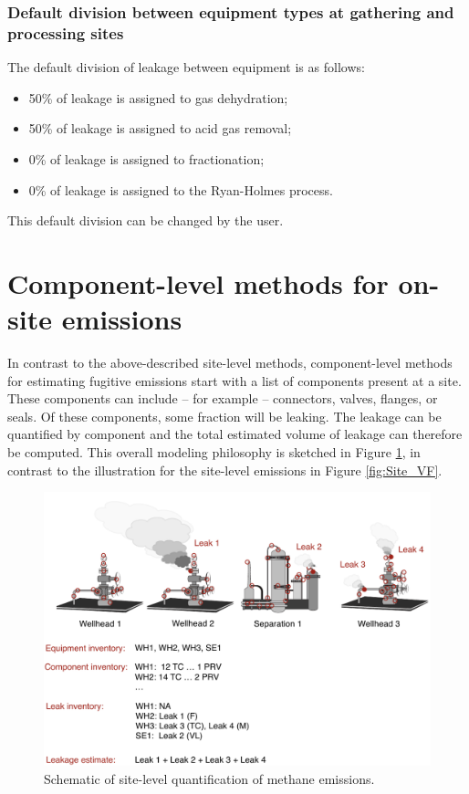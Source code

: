 \documentclass[11pt]{report}
\begin{document}
\subsubsection{Default division between equipment types at gathering and processing sites}

The default division of leakage between equipment is as follows:
\begin{itemize}
\item 50\% of leakage is assigned to gas dehydration;
\item 50\% of leakage is assigned to acid gas removal;
\item 0\% of leakage is assigned to fractionation;
\item 0\% of leakage is assigned to the Ryan-Holmes process. 
\end{itemize}

This default division can be changed by the user.

\section{Component-level methods for on-site emissions}

In contrast to the above-described site-level methods, component-level methods for estimating fugitive emissions start with a list of components present at a site. These components can include -- for example -- connectors, valves, flanges, or seals. Of these components, some fraction will be leaking. The leakage can be quantified by component and the total estimated volume of leakage can therefore be computed. This overall modeling philosophy is sketched in Figure \ref{fig:Component_VF}, in contrast to the illustration for the site-level emissions in Figure \ref{fig:Site_VF}.

\begin{figure}[t]
\includegraphics[width=1\columnwidth]{images/Component_VF.pdf}
\caption{Schematic of site-level quantification of methane emissions.}
\label{fig:Component_VF}
\end{figure}
\end{document}
